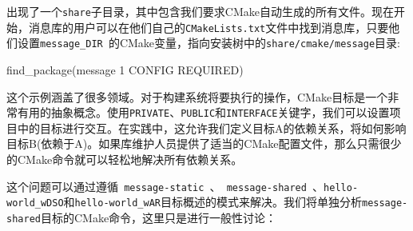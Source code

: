 出现了一个\texttt{share}子目录，其中包含我们要求CMake自动生成的所有文件。现在开始，消息库的用户可以在他们自己的\texttt{CMakeLists.txt}文件中找到消息库，只要他们设置\texttt{message\_DIR }的CMake变量，指向安装树中的\texttt{share/cmake/message}目录:

\begin{codebox}[cmake]
find_package(message 1 CONFIG REQUIRED)
\end{codebox}


这个示例涵盖了很多领域。对于构建系统将要执行的操作，CMake目标是一个非常有用的抽象概念。使用\texttt{PRIVATE}、\texttt{PUBLIC}和\texttt{INTERFACE}关键字，我们可以设置项目中的目标进行交互。在实践中，这允许我们定义目标A的依赖关系，将如何影响目标B(依赖于A)。如果库维护人员提供了适当的CMake配置文件，那么只需很少的CMake命令就可以轻松地解决所有依赖关系。

这个问题可以通过遵循\texttt{ message-static }、\texttt{ message-shared }、\texttt{hello-world\_wDSO}和\texttt{hello-world\_wAR}目标概述的模式来解决。我们将单独分析\texttt{message-shared}目标的CMake命令，这里只是进行一般性讨论：

